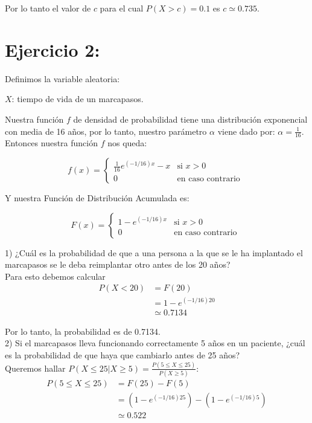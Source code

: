 \documentclass[11pt]{article}
\begin{document}
Por lo tanto el valor de $c$ para el cual $ P(X > c) = 0.1$ es $c \simeq 0.735$.

\section*{Ejercicio 2:}

Definimos la variable aleatoria:
\begin{center}
  $X$: tiempo de vida de un marcapasos.
\end{center}

Nuestra función $f$ de densidad de probabilidad tiene una distribución exponencial
con media de 16 años, por lo tanto, nuestro parámetro $\alpha$ viene dado por:
$\alpha = \frac{1}{16}$. Entonces nuestra función $f$ nos queda:

\[
  f(x) = \begin{cases}
    \frac{1}{16}e^{(-1/16)x} - x & \text{si } x > 0          \\
    0                            & \text{en caso contrario }
  \end{cases}
\]

Y nuestra Función de Distribución Acumulada es:

\[
  F(x) = \begin{cases}
    1 - e^{(-1/16)x} & \text{si } x > 0          \\
    0                            & \text{en caso contrario }
  \end{cases}
\]

1) ¿Cuál es la probabilidad de que a una persona a la que se le ha implantado el
marcapasos se le deba reimplantar otro antes de los 20 años? \\

Para esto debemos calcular
\begin{align*}
  P(X < 20) & = F(20)             \\
            & = 1 - e^{(-1/16)20} \\
            & \simeq 0.7134
\end{align*}

Por lo tanto, la probabilidad es de 0.7134. \\

2) Si el marcapasos lleva funcionando correctamente 5 años en un paciente, ¿cuál
es la probabilidad de que haya que cambiarlo antes de 25 años? \\

Queremos hallar $P(X \leq 25 | X \geq 5) = \frac{P(5 \leq X \leq 25)}{P(X \geq 5)}$:
\begin{align*}
  P(5 \leq X \leq 25) & = F(25) - F(5)                             \\
                      & = (1 - e^{(-1/16)25}) - (1 - e^{(-1/16)5}) \\
                      & \simeq 0.522
\end{align*}
\end{document}
